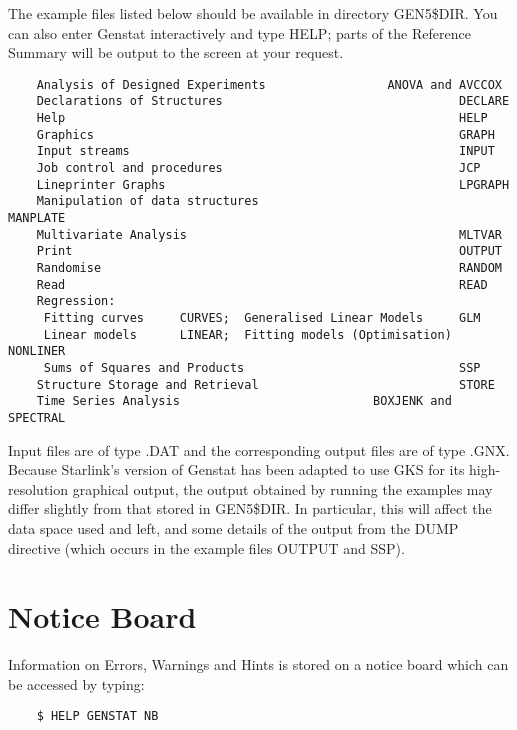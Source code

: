The example files listed below should be available in directory GEN5\$DIR.
You can also enter Genstat interactively and type HELP; parts of the Reference
Summary will be output to the screen at your request.
\begin{verbatim}
    Analysis of Designed Experiments                 ANOVA and AVCCOX
    Declarations of Structures                                 DECLARE
    Help                                                       HELP
    Graphics                                                   GRAPH
    Input streams                                              INPUT
    Job control and procedures                                 JCP
    Lineprinter Graphs                                         LPGRAPH
    Manipulation of data structures                            MANPLATE
    Multivariate Analysis                                      MLTVAR
    Print                                                      OUTPUT
    Randomise                                                  RANDOM
    Read                                                       READ
    Regression:
     Fitting curves     CURVES;  Generalised Linear Models     GLM
     Linear models      LINEAR;  Fitting models (Optimisation) NONLINER
     Sums of Squares and Products                              SSP
    Structure Storage and Retrieval                            STORE
    Time Series Analysis                           BOXJENK and SPECTRAL
\end{verbatim}
Input files are of type .DAT and the corresponding output files are of
type .GNX.
Because Starlink's version of Genstat has been adapted to use GKS for its
high-resolution graphical output, the output obtained by running the
examples may differ slightly from that stored in GEN5\$DIR.
In particular, this will affect the data space used and left, and some
details of the output from the DUMP directive (which occurs in the example
files OUTPUT and SSP).

\section{Notice Board}

Information on Errors, Warnings and Hints is stored on a notice board which
can be accessed by typing:
\begin{verbatim}
    $ HELP GENSTAT NB
\end{verbatim}

